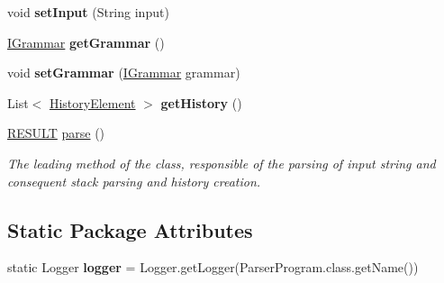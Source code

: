 \begin{DoxyCompactItemize}
\item 
\hypertarget{classparser_program_1_1_parser_program_a5db0b2d0b34c93fcd9cb06e0f3a75fbf}{void {\bfseries set\-Input} (String input)}\label{classparser_program_1_1_parser_program_a5db0b2d0b34c93fcd9cb06e0f3a75fbf}

\item 
\hypertarget{classparser_program_1_1_parser_program_a27f0e5e4b6be9950dc586832f7d20fc8}{\hyperlink{interfacecontext_free_1_1grammar_1_1_i_grammar}{I\-Grammar} {\bfseries get\-Grammar} ()}\label{classparser_program_1_1_parser_program_a27f0e5e4b6be9950dc586832f7d20fc8}

\item 
\hypertarget{classparser_program_1_1_parser_program_a8174d65b7fd5e3aca2dbe48ec1582700}{void {\bfseries set\-Grammar} (\hyperlink{interfacecontext_free_1_1grammar_1_1_i_grammar}{I\-Grammar} grammar)}\label{classparser_program_1_1_parser_program_a8174d65b7fd5e3aca2dbe48ec1582700}

\item 
\hypertarget{classparser_program_1_1_parser_program_ade596abd5eb6e01c6be4e9da8d71b39d}{List$<$ \hyperlink{classparser_program_1_1_history_element}{History\-Element} $>$ {\bfseries get\-History} ()}\label{classparser_program_1_1_parser_program_ade596abd5eb6e01c6be4e9da8d71b39d}

\item 
\hyperlink{enumparser_program_1_1_r_e_s_u_l_t}{R\-E\-S\-U\-L\-T} \hyperlink{classparser_program_1_1_parser_program_ac8e01a54887a9c9f0a9d277d5cbb0c61}{parse} ()
\begin{DoxyCompactList}\small\item\em The leading method of the class, responsible of the parsing of input string and consequent stack parsing and history creation. \end{DoxyCompactList}\end{DoxyCompactItemize}
\subsection*{Static Package Attributes}
\begin{DoxyCompactItemize}
\item 
\hypertarget{classparser_program_1_1_parser_program_a345c2f7b22b455b824b68058e2dc1a83}{static Logger {\bfseries logger} = Logger.\-get\-Logger(Parser\-Program.\-class.\-get\-Name())}\label{classparser_program_1_1_parser_program_a345c2f7b22b455b824b68058e2dc1a83}

\end{DoxyCompactItemize}
